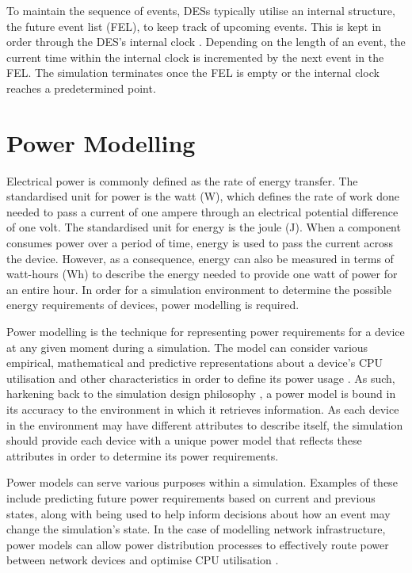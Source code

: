 \documentclass{l4proj}
\begin{document}
To maintain the sequence of events, DESs typically utilise an internal structure, the future event list (FEL), to keep track of upcoming events.
This is kept in order through the DES's internal clock \citep{Des}.
Depending on the length of an event, the current time within the internal clock is incremented by the next event in the FEL.
The simulation terminates once the FEL is empty or the internal clock reaches a predetermined point.

\section{Power Modelling}
Electrical power is commonly defined as the rate of energy transfer.
The standardised unit for power is the watt (W), which defines the rate of work done needed to pass a current of one ampere through an electrical potential difference of one volt.
The standardised unit for energy is the joule (J).
When a component consumes power over a period of time, energy is used to pass the current across the device.
However, as a consequence, energy can also be measured in terms of watt-hours (Wh) to describe the energy needed to provide one watt of power for an entire hour.
In order for a simulation environment to determine the possible energy requirements of devices, power modelling is required.

Power modelling is the technique for representing power requirements for a device at any given moment during a simulation.
The model can consider various empirical, mathematical and predictive representations about a device's CPU utilisation and other characteristics in order to define its power usage \citep{IET_Power_System_Modeling}.
As such, harkening back to the simulation design philosophy \citep{simulations}, a power model is bound in its accuracy to the environment in which it retrieves information.
As each device in the environment may have different attributes to describe itself, the simulation should provide each device with a unique power model that reflects these attributes in order to determine its power requirements.

Power models can serve various purposes within a simulation.
Examples of these include predicting future power requirements based on current and previous states, along with being used to help inform decisions about how an event may change the simulation's state.
In the case of modelling network infrastructure, power models can allow power distribution processes to effectively route power between network devices and optimise CPU utilisation \citep{etap}.
\end{document}
